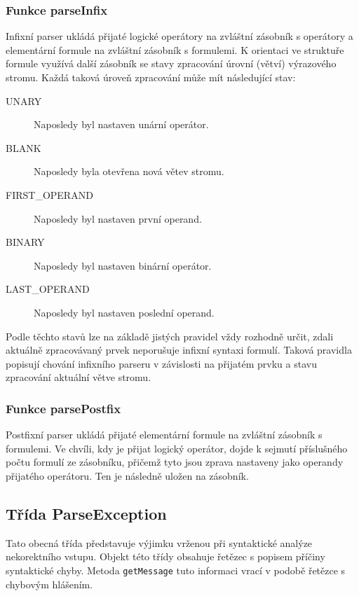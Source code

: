 \documentclass[thesis=B,czech,hidelinks]{thesis}[2012/06/26]
\begin{document}
\subsubsection{Funkce parseInfix}

Infixní parser ukládá přijaté logické operátory na zvláštní zásobník s operátory a elementární formule na zvláštní zásobník s formulemi. K orientaci ve struktuře formule využívá další zásobník se stavy zpracování úrovní (větví) výrazového stromu. Každá taková úroveň zpracování může mít následující stav:

\begin{description}
\item[UNARY] Naposledy byl nastaven unární operátor. 
\item[BLANK] Naposledy byla otevřena nová větev stromu.
\item[FIRST\_OPERAND] Naposledy byl nastaven první operand.
\item[BINARY] Naposledy byl nastaven binární operátor.
\item[LAST\_OPERAND] Naposledy byl nastaven poslední operand.
\end{description}

Podle těchto stavů lze na základě jistých pravidel vždy rozhodně určit, zdali aktuálně zpracovávaný prvek neporušuje infixní syntaxi formulí. Taková pravidla popisují chování infixního parseru v závislosti na přijatém prvku a stavu zpracování aktuální větve stromu.

\subsubsection{Funkce parsePostfix}

Postfixní parser ukládá přijaté elementární formule na zvláštní zásobník s formulemi. Ve chvíli, kdy je přijat logický operátor, dojde k sejmutí příslušného počtu formulí ze zásobníku, přičemž tyto jsou zprava nastaveny jako operandy přijatého operátoru. Ten je následně uložen na zásobník.

\subsection{Třída ParseException}

Tato obecná třída představuje výjimku vrženou při syntaktické analýze nekorektního vstupu. Objekt této třídy obsahuje řetězec s popisem příčiny syntaktické chyby. Metoda \texttt{getMessage} tuto informaci vrací v podobě řetězce s chybovým hlášením.
\end{document}
